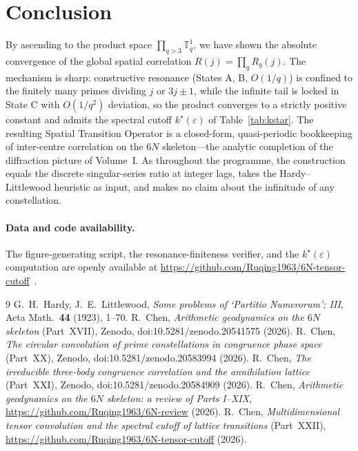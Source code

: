 \documentclass[11pt,a4paper]{article}
\begin{document}
\section{Conclusion}
By ascending to the product space $\prod_{q>3}\mathbb{T}^1_q$, we have shown the
absolute convergence of the global spatial correlation $R(j)=\prod_q R_q(j)$. The
mechanism is sharp: constructive resonance (States A, B, $O(1/q)$) is confined to
the finitely many primes dividing $j$ or $3j\pm1$, while the infinite tail is locked
in State C with $O(1/q^2)$ deviation, so the product converges to a strictly
positive constant and admits the spectral cutoff $k^\star(\varepsilon)$ of
Table~\ref{tab:kstar}. The resulting Spatial Transition Operator is a closed-form,
quasi-periodic bookkeeping of inter-centre correlation on the $6N$ skeleton---the
analytic completion of the diffraction picture of Volume~I. As throughout the
programme, the construction equals the discrete singular-series ratio at integer
lags, takes the Hardy--Littlewood heuristic as input, and makes no claim about the
infinitude of any constellation.

\paragraph{Data and code availability.}
The figure-generating script, the resonance-finiteness verifier, and the
$k^\star(\varepsilon)$ computation are openly available at
\url{https://github.com/Ruqing1963/6N-tensor-cutoff}~\cite{repo}.

\begin{thebibliography}{9}
 G.~H.~Hardy, J.~E.~Littlewood, \emph{Some problems of `Partitio
Numerorum'; III}, Acta Math.\ \textbf{44} (1923), 1--70.
 R.~Chen, \emph{Arithmetic geodynamics on the $6N$ skeleton}
(Part~XVII), Zenodo, doi:10.5281/zenodo.20541575 (2026).
 R.~Chen, \emph{The circular convolution of prime constellations
in congruence phase space} (Part~XX), Zenodo, doi:10.5281/zenodo.20583994 (2026).
 R.~Chen, \emph{The irreducible three-body congruence correlation
and the annihilation lattice} (Part~XXI), Zenodo, doi:10.5281/zenodo.20584909 (2026).
 R.~Chen, \emph{Arithmetic geodynamics on the $6N$ skeleton: a
review of Parts I--XIX}, \url{https://github.com/Ruqing1963/6N-review} (2026).
 R.~Chen, \emph{Multidimensional tensor convolution and the spectral
cutoff of lattice transitions} (Part~XXII),
\url{https://github.com/Ruqing1963/6N-tensor-cutoff} (2026).
\end{thebibliography}
\end{document}
